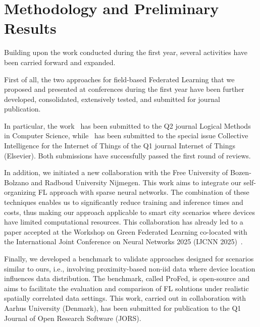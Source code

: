 \documentclass[runningheads]{llncs}
\begin{document}
\section{Methodology and Preliminary Results}\label{sec:methodology}
Building upon the work conducted during the first year, 
 several activities have been carried forward and expanded.

First of all, the two approaches for field-based Federated Learning that we proposed and presented 
 at conferences during the first year have been further developed, consolidated, extensively tested, 
 and submitted for journal publication. 
 
In particular, the work~\cite{DBLP:conf/coordination/DominiAEV24}
 has been submitted to the Q2 journal Logical Methods in Computer Science, 
 while~\cite{DBLP:conf/acsos/DominiFAVE24} has been submitted to the special issue
 Collective Intelligence for the Internet of Things of the Q1 journal Internet of Things (Elsevier). 
% 
Both submissions have successfully passed the first round of reviews.

In addition, we initiated a new collaboration with the Free University of Bozen-Bolzano and Radboud University Nijmegen. 
%
This work aims to integrate our self-organizing FL approach with sparse neural networks. 
%
The combination of these techniques enables us to significantly reduce training and inference times and costs, 
 thus making our approach applicable to smart city scenarios where devices have limited computational resources. 
%
This collaboration has already led to a paper accepted at the Workshop on Green Federated Learning 
 co-located with the International Joint Conference on Neural Networks 2025 (IJCNN 2025)~\cite{DBLP:journals/corr/abs-2507-07613}.

Finally, we developed a benchmark to validate approaches designed for scenarios similar to ours, 
 i.e., involving proximity-based non-iid data where device location influences data distribution. 
% 
The benchmark, called ProFed, is open-source and aims to facilitate the evaluation and comparison 
 of FL solutions under realistic spatially correlated data settings. 
% 
This work, carried out in collaboration with Aarhus University (Denmark), 
 has been submitted for publication to the Q1 Journal of Open Research Software (JORS).

\end{document}
